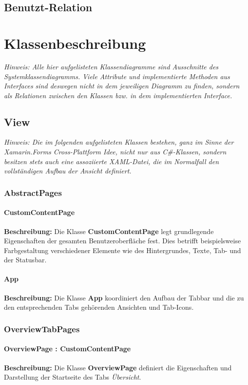 \documentclass[a4paper]{scrreprt}
\begin{document}
\section{Benutzt-Relation}

\chapter{Klassenbeschreibung}
\textit{Hinweis: Alle hier aufgelisteten Klassendiagramme sind Ausschnitte des Systemklassendiagramms. Viele Attribute und implementierte Methoden aus Interfaces sind deswegen nicht in dem jeweiligen Diagramm zu finden, sondern als Relationen zwischen den Klassen bzw. in dem implementierten Interface.}
 
\section{View}
\textit{Hinweis: Die im folgenden aufgelisteten Klassen bestehen, ganz im Sinne der Xamarin.Forms Cross-Plattform Idee, nicht nur aus C\#-Klassen, sondern besitzen stets auch eine assoziierte XAML-Datei, die im Normalfall den vollständigen Aufbau der Ansicht definiert.}

\subsection{AbstractPages}
\subsubsection{CustomContentPage}
\textbf{Beschreibung:} Die Klasse \textbf{CustomContentPage} legt grundlegende Eigenschaften der gesamten Benutzeroberfläche fest. Dies betrifft beispielsweise Farbgestaltung verschiedener Elemente wie des Hintergrundes, Texte, Tab- und der Statusbar.

\subsubsection{App}
\textbf{Beschreibung:} Die Klasse \textbf{App} koordiniert den Aufbau der Tabbar und die zu den entsprechenden Tabs gehörenden Ansichten und Tab-Icons.

\subsection{OverviewTabPages}
\subsubsection{OverviewPage : CustomContentPage}
\textbf{Beschreibung:} Die Klasse \textbf{OverviewPage} definiert die Eigenschaften und Darstellung der Startseite des Tabs \textit{Übersicht}.
\end{document}
